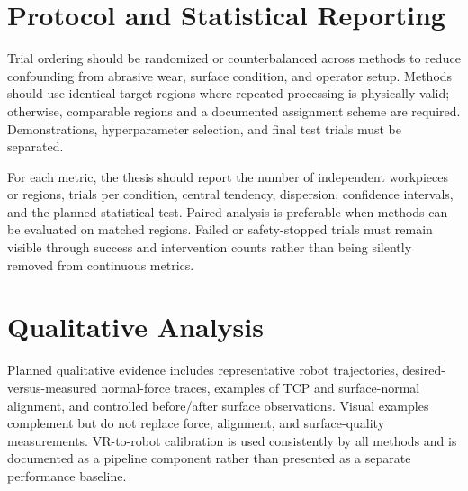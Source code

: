 \begin{table}
\centering
\caption{Planned ablation of residual RL precision policies.}
\label{tab:residual_rl_ablation}
\scriptsize
\setlength{\tabcolsep}{2.8pt}
\end{table}
\clearpage

\section{Protocol and Statistical Reporting}
Trial ordering should be randomized or counterbalanced across methods to reduce confounding from abrasive wear, surface condition, and operator setup. Methods should use identical target regions where repeated processing is physically valid; otherwise, comparable regions and a documented assignment scheme are required. Demonstrations, hyperparameter selection, and final test trials must be separated.

For each metric, the thesis should report the number of independent workpieces or regions, trials per condition, central tendency, dispersion, confidence intervals, and the planned statistical test. Paired analysis is preferable when methods can be evaluated on matched regions. Failed or safety-stopped trials must remain visible through success and intervention counts rather than being silently removed from continuous metrics.

\section{Qualitative Analysis}
Planned qualitative evidence includes representative robot trajectories, desired-versus-measured normal-force traces, examples of TCP and surface-normal alignment, and controlled before/after surface observations. Visual examples complement but do not replace force, alignment, and surface-quality measurements. VR-to-robot calibration is used consistently by all methods and is documented as a pipeline component rather than presented as a separate performance baseline.

